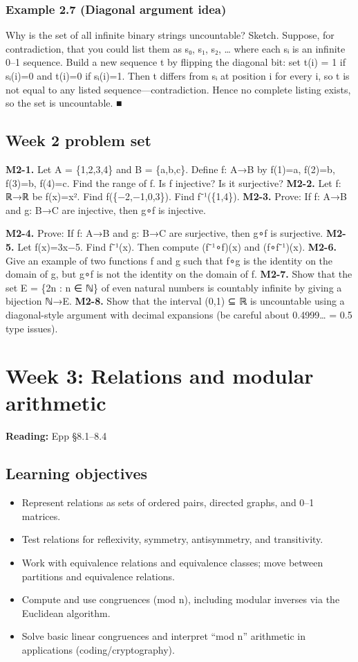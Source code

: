 \documentclass[11pt]{article}
\begin{document}
\subsubsection*{Example 2.7 (Diagonal argument idea)}
Why is the set of all infinite binary strings uncountable?
Sketch. Suppose, for contradiction, that you could list them as s₀, s₁, s₂, … where
each sᵢ is an infinite 0–1 sequence.
Build a new sequence t by flipping the diagonal bit: set t(i) = 1 if sᵢ(i)=0 and t(i)=0
if sᵢ(i)=1.
Then t differs from sᵢ at position i for every i, so t is not equal to any listed
sequence—contradiction.
Hence no complete listing exists, so the set is uncountable. ■
\subsection*{Week 2 problem set}
\textbf{M2-1.} Let A = \{1,2,3,4\} and B = \{a,b,c\}. Define f: A→B by f(1)=a, f(2)=b, f(3)=b,
f(4)=c. Find the range of f. Is f injective? Is it surjective?
\textbf{M2-2.} Let f: ℝ→ℝ be f(x)=x². Find f(\{−2,−1,0,3\}). Find f⁻¹(\{1,4\}).
\textbf{M2-3.} Prove: If f: A→B and g: B→C are injective, then g∘f is injective.

\textbf{M2-4.} Prove: If f: A→B and g: B→C are surjective, then g∘f is surjective.
\textbf{M2-5.} Let f(x)=3x−5. Find f⁻¹(x). Then compute (f⁻¹∘f)(x) and (f∘f⁻¹)(x).
\textbf{M2-6.} Give an example of two functions f and g such that f∘g is the identity on the
domain of g, but g∘f is not the identity on the domain of f.
\textbf{M2-7.} Show that the set E = \{2n : n ∈ ℕ\} of even natural numbers is countably infinite
by giving a bijection ℕ→E.
\textbf{M2-8.} Show that the interval (0,1) ⊆ ℝ is uncountable using a diagonal-style argument
with decimal expansions (be careful about 0.4999… = 0.5 type issues).

\clearpage
\section{Week 3: Relations and modular arithmetic}
\textbf{Reading:} Epp §8.1–8.4
\subsection*{Learning objectives}
\begin{itemize}[leftmargin=*,itemsep=0.25em]
\item Represent relations as sets of ordered pairs, directed graphs, and 0–1 matrices.
\item Test relations for reflexivity, symmetry, antisymmetry, and transitivity.
\item Work with equivalence relations and equivalence classes; move between partitions and equivalence relations.
\item Compute and use congruences (mod n), including modular inverses via the Euclidean algorithm.
\item Solve basic linear congruences and interpret “mod n” arithmetic in applications (coding/cryptography).
\end{itemize}
\end{document}
